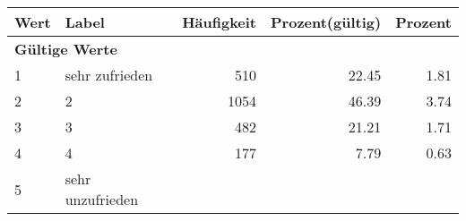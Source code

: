     \begin{longtable}{lXrrr}
     \toprule
     \textbf{Wert} & \textbf{Label} & \textbf{Häufigkeit} & \textbf{Prozent(gültig)} & \textbf{Prozent} \\
     \endhead
     \midrule
     \multicolumn{5}{l}{\textbf{Gültige Werte}}\\

     1 &
     \multicolumn{1}{X}{ sehr zufrieden   } &


       \num{510} &
       \num[round-mode=places,round-precision=2]{22,45} &
         \num[round-mode=places,round-precision=2]{1,81} \\

     2 &
     \multicolumn{1}{X}{ 2   } &


       \num{1054} &
       \num[round-mode=places,round-precision=2]{46,39} &
         \num[round-mode=places,round-precision=2]{3,74} \\

     3 &
     \multicolumn{1}{X}{ 3   } &


       \num{482} &
       \num[round-mode=places,round-precision=2]{21,21} &
         \num[round-mode=places,round-precision=2]{1,71} \\

     4 &
     \multicolumn{1}{X}{ 4   } &


       \num{177} &
       \num[round-mode=places,round-precision=2]{7,79} &
         \num[round-mode=places,round-precision=2]{0,63} \\

     5 &
     \multicolumn{1}{X}{ sehr unzufrieden   } &



\end{longtable}

